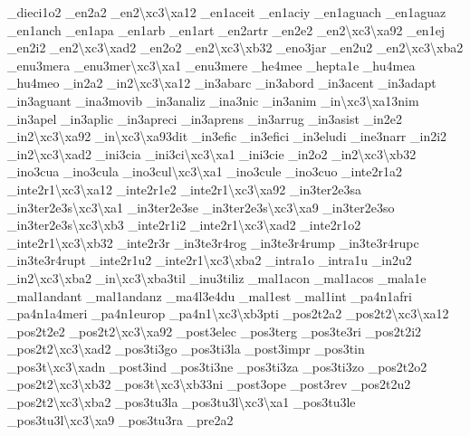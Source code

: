 \begin{DoxyCompactItemize}
\-\_\-dieci1o2 \-\_\-en2a2 \-\_\-en2\textbackslash{}xc3\textbackslash{}xa12 \-\_\-en1aceit \-\_\-en1aciy \-\_\-en1aguach \-\_\-en1aguaz \-\_\-en1anch \-\_\-en1apa \-\_\-en1arb \-\_\-en1art \-\_\-en2artr \-\_\-en2e2 \-\_\-en2\textbackslash{}xc3\textbackslash{}xa92 \-\_\-en1ej \-\_\-en2i2 \-\_\-en2\textbackslash{}xc3\textbackslash{}xad2 \-\_\-en2o2 \-\_\-en2\textbackslash{}xc3\textbackslash{}xb32 \-\_\-eno3jar \-\_\-en2u2 \-\_\-en2\textbackslash{}xc3\textbackslash{}xba2 \-\_\-enu3mera \-\_\-enu3mer\textbackslash{}xc3\textbackslash{}xa1 \-\_\-enu3mere \-\_\-he4mee \-\_\-hepta1e \-\_\-hu4mea \-\_\-hu4meo \-\_\-in2a2 \-\_\-in2\textbackslash{}xc3\textbackslash{}xa12 \-\_\-in3abarc \-\_\-in3abord \-\_\-in3acent \-\_\-in3adapt \-\_\-in3aguant \-\_\-ina3movib \-\_\-in3analiz \-\_\-ina3nic \-\_\-in3anim \-\_\-in\textbackslash{}xc3\textbackslash{}xa13nim \-\_\-in3apel \-\_\-in3aplic \-\_\-in3apreci \-\_\-in3aprens \-\_\-in3arrug \-\_\-in3asist \-\_\-in2e2 \-\_\-in2\textbackslash{}xc3\textbackslash{}xa92 \-\_\-in\textbackslash{}xc3\textbackslash{}xa93dit \-\_\-in3efic \-\_\-in3efici \-\_\-in3eludi \-\_\-ine3narr \-\_\-in2i2 \-\_\-in2\textbackslash{}xc3\textbackslash{}xad2 \-\_\-ini3cia \-\_\-ini3ci\textbackslash{}xc3\textbackslash{}xa1 \-\_\-ini3cie \-\_\-in2o2 \-\_\-in2\textbackslash{}xc3\textbackslash{}xb32 \-\_\-ino3cua \-\_\-ino3cula \-\_\-ino3cul\textbackslash{}xc3\textbackslash{}xa1 \-\_\-ino3cule \-\_\-ino3cuo \-\_\-inte2r1a2 \-\_\-inte2r1\textbackslash{}xc3\textbackslash{}xa12 \-\_\-inte2r1e2 \-\_\-inte2r1\textbackslash{}xc3\textbackslash{}xa92 \-\_\-in3ter2e3sa \-\_\-in3ter2e3s\textbackslash{}xc3\textbackslash{}xa1 \-\_\-in3ter2e3se \-\_\-in3ter2e3s\textbackslash{}xc3\textbackslash{}xa9 \-\_\-in3ter2e3so \-\_\-in3ter2e3s\textbackslash{}xc3\textbackslash{}xb3 \-\_\-inte2r1i2 \-\_\-inte2r1\textbackslash{}xc3\textbackslash{}xad2 \-\_\-inte2r1o2 \-\_\-inte2r1\textbackslash{}xc3\textbackslash{}xb32 \-\_\-inte2r3r \-\_\-in3te3r4rog \-\_\-in3te3r4rump \-\_\-in3te3r4rupc \-\_\-in3te3r4rupt \-\_\-inte2r1u2 \-\_\-inte2r1\textbackslash{}xc3\textbackslash{}xba2 \-\_\-intra1o \-\_\-intra1u \-\_\-in2u2 \-\_\-in2\textbackslash{}xc3\textbackslash{}xba2 \-\_\-in\textbackslash{}xc3\textbackslash{}xba3til \-\_\-inu3tiliz \-\_\-mal1acon \-\_\-mal1acos \-\_\-mala1e \-\_\-mal1andant \-\_\-mal1andanz \-\_\-ma4l3e4du \-\_\-mal1est \-\_\-mal1int \-\_\-pa4n1afri \-\_\-pa4n1a4meri \-\_\-pa4n1europ \-\_\-pa4n1\textbackslash{}xc3\textbackslash{}xb3pti \-\_\-pos2t2a2 \-\_\-pos2t2\textbackslash{}xc3\textbackslash{}xa12 \-\_\-pos2t2e2 \-\_\-pos2t2\textbackslash{}xc3\textbackslash{}xa92 \-\_\-post3elec \-\_\-pos3terg \-\_\-pos3te3ri \-\_\-pos2t2i2 \-\_\-pos2t2\textbackslash{}xc3\textbackslash{}xad2 \-\_\-pos3ti3go \-\_\-pos3ti3la \-\_\-post3impr \-\_\-pos3tin \-\_\-pos3t\textbackslash{}xc3\textbackslash{}xadn \-\_\-post3ind \-\_\-pos3ti3ne \-\_\-pos3ti3za \-\_\-pos3ti3zo \-\_\-pos2t2o2 \-\_\-pos2t2\textbackslash{}xc3\textbackslash{}xb32 \-\_\-pos3t\textbackslash{}xc3\textbackslash{}xb33ni \-\_\-post3ope \-\_\-post3rev \-\_\-pos2t2u2 \-\_\-pos2t2\textbackslash{}xc3\textbackslash{}xba2 \-\_\-pos3tu3la \-\_\-pos3tu3l\textbackslash{}xc3\textbackslash{}xa1 \-\_\-pos3tu3le \-\_\-pos3tu3l\textbackslash{}xc3\textbackslash{}xa9 \-\_\-pos3tu3ra \-\_\-pre2a2 
\end{DoxyCompactItemize}
